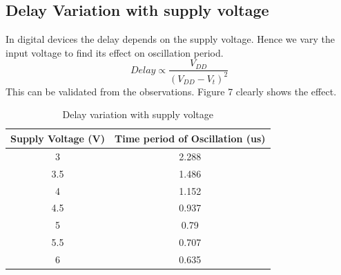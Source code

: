 \documentclass[12pt]{article}
\begin{document}
\subsection{Delay Variation with supply voltage}
In digital devices the delay depends on the supply voltage. Hence we vary the input voltage to find its effect on oscillation period. 
\[Delay\propto\frac{V_{DD}}{(V_{DD}-V_{t})^2}\]
This can be validated from the observations. Figure 7 clearly shows the effect.
\begin{table}[!h]
\centering  %
\begin{tabular}{|c | c |}                                                             
\hline  %
Supply Voltage (V) & Time period of Oscillation (us) \\  %
\hline  %

3 &	2.288\\
3.5 &	1.486\\
4	 & 1.152\\
4.5	& 0.937\\
5	& 0.79\\
5.5	& 0.707\\
6	& 0.635\\



\hline  %
\end{tabular}
\caption{Delay variation with supply voltage}
\label{table:demotable}
\end{table}
\end{document}
